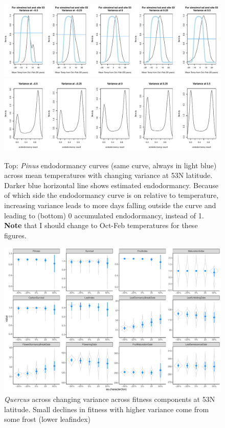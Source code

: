 \documentclass[11pt,letter]{article}
\begin{document}
\begin{figure} 
 \begin{center}
\noindent \includegraphics[width=1\textwidth]{..//analyses/graphs/phenofit/sims/extras/flowerendodorm/flowerendodormPinusMeanTemp53.pdf}
\noindent \includegraphics[width=1\textwidth]{..//analyses/graphs/phenofit/sims/extras/flowerendodorm/flowerendodormPinus53.pdf}
  \caption{Top: \emph{Pinus} endodormancy curves (same curve, always in light blue) across mean temperatures with changing variance at 53\degree N latitude. Darker blue horizontal line shows estimated endodormancy. Because of which side the endodormancy curve is on relative to temperature, increasing variance leads to more days falling outside the curve and leading to (bottom) 0 accumulated endodormancy, instead of 1. {\bf Note} that I should change to Oct-Feb temperatures for these figures.}
  \label{fig:pinusendodorm53}
  \end{center}
\end{figure}

\begin{figure} 
 \begin{center}
\noindent \includegraphics[width=1\textwidth]{..//analyses/graphs/phenofit/sims/sdsim53_allmetricsQR.pdf}
  \caption{\emph{Quercus} across changing variance across fitness components at 53\degree N latitude. Small declines in fitness with higher variance come from some frost (lower leafindex)}
  \label{fig:quercussd53}
  \end{center}
\end{figure}
\end{document}

